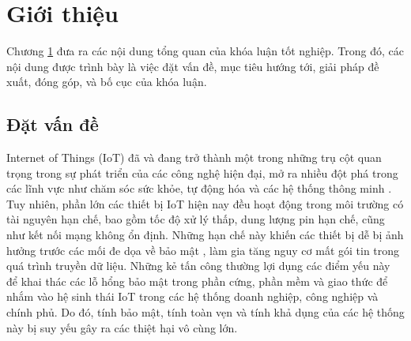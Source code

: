 \chapter{Giới thiệu}
\label{Chapter1}

Chương \ref{Chapter1}    đưa ra các nội dung tổng quan của khóa luận tốt nghiệp. Trong đó, các
nội dung được trình bày là việc đặt vấn đề, mục tiêu hướng tới, giải pháp đề xuất,
đóng góp, và bố cục của khóa luận.

\section{Đặt vấn đề}
\label{sec:prob}
Internet of Things (IoT) đã và đang trở thành một trong những trụ cột quan trọng trong sự phát triển của các công nghệ hiện đại, mở ra nhiều đột phá trong các lĩnh vực như chăm sóc sức khỏe, tự động hóa và các hệ thống thông minh \cite{iot1}. Tuy nhiên, phần lớn các thiết bị IoT hiện nay đều hoạt động trong môi trường có tài nguyên hạn chế, bao gồm tốc độ xử lý thấp, dung lượng pin hạn chế, cũng như kết nối mạng không ổn định. Những hạn chế này khiến các thiết bị dễ bị ảnh hưởng trước các mối đe dọa về bảo mật \cite{iot2}, làm gia tăng nguy cơ mất gói tin trong quá trình truyền dữ liệu. Những kẻ tấn công thường lợi dụng các điểm yếu này để khai thác các lỗ hổng bảo mật trong phần cứng, phần mềm và giao thức để nhắm vào hệ sinh thái IoT trong các hệ thống doanh nghiệp, công nghiệp và chính phủ. Do đó, tính bảo mật, tính toàn vẹn và tính khả dụng của các hệ thống này bị suy yếu gây ra các thiệt hại vô cùng lớn.

